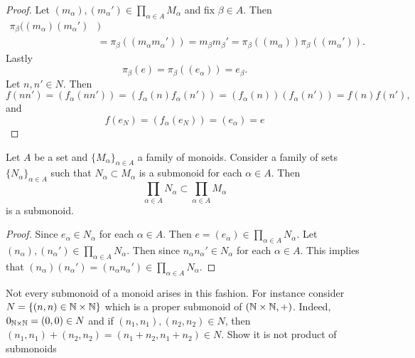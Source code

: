 \begin{proof}
    Let $(m_\alpha),(m_\alpha')\in \prod_{\alpha\in A} M_\alpha$ and fix $\beta \in A$. Then 
    \begin{align*} 
        \pi_\beta((m_\alpha)(m_\alpha') &)\\ 
        &= \pi_\beta((m_\alpha m_\alpha')) = m_\beta m_\beta' = \pi_\beta((m_\alpha))\pi_\beta((m_\alpha')).
    \end{align*}
    Lastly 
    $$\pi_\beta(e)=\pi_\beta((e_\alpha))=e_\beta.$$
    Let $n,n' \in N$. Then 
    $$f(nn') = (f_\alpha(nn'))=(f_\alpha(n)f_\alpha(n'))=(f_\alpha(n))(f_\alpha(n'))=f(n)f(n'),$$
    and 
    $$f(e_N)=(f_\alpha(e_N))=(e_\alpha)=e$$
\end{proof}
\begin{proposition}\label{CertainSubmonoidsOfProductMonoid}
    Let $A$ be a set and $\{M_\alpha\}_{\alpha\in A}$ a family of monoids. Consider a family of sets $\{N_\alpha\}_{\alpha\in A}$ such that $N_\alpha\subset M_\alpha$ is a submonoid for each $\alpha\in A$. Then $$\prod_{\alpha\in A} N_\alpha \subset \prod_{\alpha \in A} M_\alpha$$
    is a submonoid.
\end{proposition}
\begin{proof}
    Since $e_\alpha \in N_\alpha$ for each $\alpha \in A$. Then $e=(e_\alpha)\in \prod_{\alpha\in A} N_\alpha.$ Let $(n_\alpha),(n_\alpha')\in \prod_{\alpha\in A} N_\alpha$. Then since $n_\alpha n_\alpha'\in N_\alpha$ for each $\alpha \in A$. This implies that $(n_\alpha)(n_\alpha') = (n_\alpha n_\alpha')\in \prod_{\alpha\in A} N_\alpha$.
\end{proof}
\begin{example}
    Not every submonoid of a monoid arises in this fashion. For instance consider $N=\{(n,n)\in\mathbb{N}\times \mathbb{N} \}$ which is a proper submonoid of $(\mathbb{N}\times \mathbb{N},+)$. Indeed, $0_{\mathbb{N}\times \mathbb{N}} = (0,0)\in N$ and if $(n_1,n_1),(n_2,n_2)\in N$, then $(n_1,n_1)+(n_2,n_2)=(n_1+n_2,n_1+n_2)\in N$. {\Large Show it is not product of submonoids}
\end{example}
